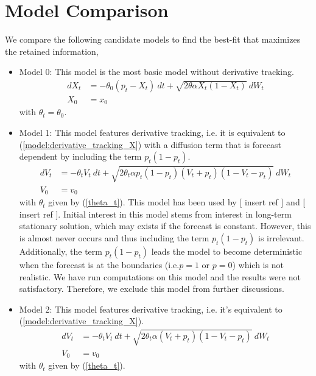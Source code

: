 \documentclass[10pt,twocolumn,letterpaper]{article}
\begin{document}
\section{Model Comparison}
We compare the following candidate models to find the best-fit that maximizes the retained information,
\begin{itemize}
  \item Model 0: This model is the most basic model without derivative tracking.
  \begin{equation}
  \begin{split}
  dX_t &=  - \theta_0 (p_t-X_t) \  dt + \sqrt{2 \theta \alpha X_t (1-X_t)} \  dW_t  \\ %
  X_0 & = x_0
\end{split}\label{M0}
  \end{equation}
  with $\theta_t= \theta_0 $.

  \item Model 1: This model features derivative tracking, i.e. it is equivalent to (\ref{model:derivative_tracking_X}) with a diffusion term that is forecast dependent by including the term $p_t(1-p_t)$.
  \begin{equation}
  \begin{split}
  dV_t &=  - \theta_t V_t \  dt + \sqrt{2 \theta_t \alpha p_t(1-p_t)(V_t +p_t ) (1-V_t-p_t)} \  dW_t  \\ %
  V_0 & = v_0
  \end{split}\label{M2}
  \end{equation}
  with $\theta_t$ given by (\ref{theta_t}). This model has been used by [ insert ref ] and [ insert ref ]. Initial interest in this model stems from interest in long-term stationary solution, which may exists  if the forecast is constant. However, this is almost never occurs and thus including the term $p_t(1-p_t)$ is irrelevant. Additionally, the term $p_t(1-p_t)$ leads the model to become deterministic when the forecast is at the boundaries (i.e.$p=1$ or $p=0$)  which is not realistic. We have run computations on this model and the results were not satisfactory. Therefore, we exclude this model from further discussions.
  
  \item Model 2: This model features derivative tracking, i.e. it's equivalent to (\ref{model:derivative_tracking_X}).
\begin{equation}
  \begin{split}
  dV_t &=  - \theta_t V_t \  dt + \sqrt{2 \theta_t \alpha (V_t +p_t ) (1-V_t-p_t)} \  dW_t  \\ %
  V_0 & = v_0
  \end{split}\label{M2}
  \end{equation}
  with $\theta_t$ given by (\ref{theta_t}).
\end{itemize}
\end{document}
